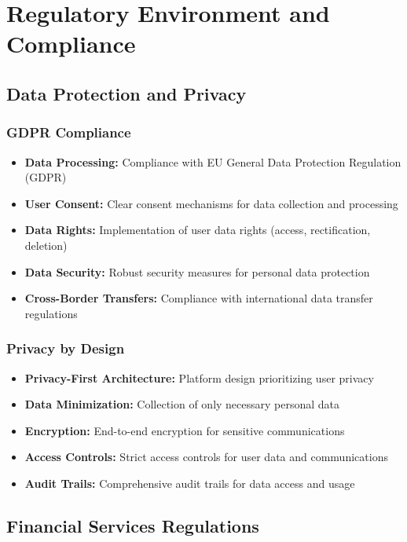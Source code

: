 \section{Regulatory Environment and Compliance}

\subsection{Data Protection and Privacy}

\subsubsection{GDPR Compliance}
\begin{itemize}
    \item \textbf{Data Processing:} Compliance with EU General Data Protection Regulation (GDPR)
    \item \textbf{User Consent:} Clear consent mechanisms for data collection and processing
    \item \textbf{Data Rights:} Implementation of user data rights (access, rectification, deletion)
    \item \textbf{Data Security:} Robust security measures for personal data protection
    \item \textbf{Cross-Border Transfers:} Compliance with international data transfer regulations
\end{itemize}

\subsubsection{Privacy by Design}
\begin{itemize}
    \item \textbf{Privacy-First Architecture:} Platform design prioritizing user privacy
    \item \textbf{Data Minimization:} Collection of only necessary personal data
    \item \textbf{Encryption:} End-to-end encryption for sensitive communications
    \item \textbf{Access Controls:} Strict access controls for user data and communications
    \item \textbf{Audit Trails:} Comprehensive audit trails for data access and usage
\end{itemize}

\subsection{Financial Services Regulations}

